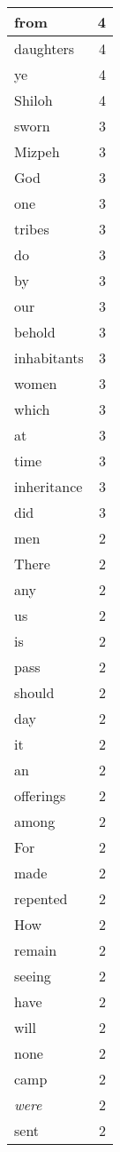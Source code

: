 \begin{center}
\begin{longtable}{l|r}
from & 4 \\ \hline
daughters & 4 \\ \hline
ye & 4 \\ \hline
Shiloh & 4 \\ \hline
sworn & 3 \\ \hline
Mizpeh & 3 \\ \hline
God & 3 \\ \hline
one & 3 \\ \hline
tribes & 3 \\ \hline
do & 3 \\ \hline
by & 3 \\ \hline
our & 3 \\ \hline
behold & 3 \\ \hline
inhabitants & 3 \\ \hline
women & 3 \\ \hline
which & 3 \\ \hline
at & 3 \\ \hline
time & 3 \\ \hline
inheritance & 3 \\ \hline
did & 3 \\ \hline
men & 2 \\ \hline
There & 2 \\ \hline
any & 2 \\ \hline
us & 2 \\ \hline
is & 2 \\ \hline
pass & 2 \\ \hline
should & 2 \\ \hline
day & 2 \\ \hline
it & 2 \\ \hline
an & 2 \\ \hline
offerings & 2 \\ \hline
among & 2 \\ \hline
For & 2 \\ \hline
made & 2 \\ \hline
repented & 2 \\ \hline
How & 2 \\ \hline
remain & 2 \\ \hline
seeing & 2 \\ \hline
have & 2 \\ \hline
will & 2 \\ \hline
none & 2 \\ \hline
camp & 2 \\ \hline
\emph{were} & 2 \\ \hline
sent & 2 \\ \hline

\end{longtable}
\end{center}
